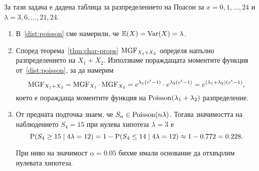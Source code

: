 \documentclass[numbers=endperiod, DIV=15, bibliography=totocnumbered]{scrartcl}
\begin{document}
\begin{note}
  За тази задача е дадена таблица за разпределението на Поасон за $x = 0, 1, \ldots, 24$ и $\lambda = 3, 6, \ldots, 21, 24$.
\end{note}

\begin{solution}
  \mbox{}
  \begin{enumerate}[label=\alph*)]
    \item В~\ref{dist:poisson} сме намерили, че $\mathbb{E}(X) = \operatorname{Var}(X) = \lambda$.
    \item Според теорема~\ref{thm:char-props} $\operatorname{MGF}_{X_1 + X_2}$ определя напълно разпределението на $X_1 + X_2$. Използваме пораждащата моментите функция от~\ref{dist:poisson}, за да намерим
    \begin{displaymath}
      \operatorname{MGF}_{X_1 + X_2}
      =
      \operatorname{MGF}_{X_1} \cdot \operatorname{MGF}_{X_2}
      =
      e^{\lambda_1 (e^t - 1)} \cdot e^{\lambda_2 (e^t - 1)}
      =
      e^{(\lambda_1 + \lambda_2) (e^t - 1)},
    \end{displaymath}
    което е пораждаща моментите функция на $\operatorname{Poisson}(\lambda_1 + \lambda_2)$ разпределение.

    \item От предната подточка знаем, че $S_n \in \operatorname{Poisson}(n \lambda)$. Тогава значимостта на наблюдението $S_4 = 15$ при нулева хипотеза $\lambda = 3$ е
    \begin{displaymath}
      \operatorname{P}(S_4 \geq 15 \mid 4\lambda = 12)
      =
      1 - \operatorname{P}(S_4 \leq 14 \mid 4\lambda = 12)
      \approx
      1 - 0.772
      =
      0.228.
    \end{displaymath}

    При ниво на значимост $\alpha = 0.05$ бихме имали основание да отхвърлим нулевата хипотеза.
  \end{enumerate}
\end{solution}

\printbibliography
\end{document}
